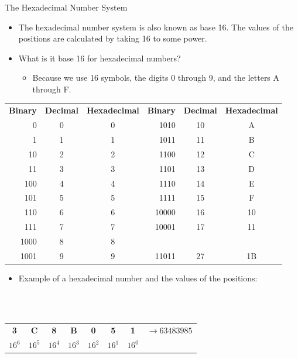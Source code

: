 \documentclass[graphics]{beamer}
\newcommand*{\thead}[1]{\multicolumn{1}{c}{\bfseries #1}}
\begin{document}
\begin{frame}{The Hexadecimal Number System}
     {
        \begin{itemize}
            \item The hexadecimal number system is also known as base 16. The values of the positions are calculated by taking 16 to some power.
            \item What is it base 16 for hexadecimal numbers?
            \begin{itemize}
                \item Because we use 16 symbols, the digits 0 through 9, and the letters A through F.
            \end{itemize}
        \end{itemize}
    }
     {
        \begin{tabular}{r c c | r c c}
             \thead{Binary} & \thead{Decimal} & \thead{Hexadecimal} & \thead{Binary} & \thead{Decimal} & \thead{Hexadecimal}  \\
             0    & 0 & 0 & 1010 & 10 & A \\
             1    & 1 & 1 & 1011 & 11 & B \\
             10   & 2 & 2 & 1100 & 12 & C \\
             11   & 3 & 3 & 1101 & 13 & D \\
             100  & 4 & 4 & 1110 & 14 & E \\
             101  & 5 & 5 & 1111 & 15 & F \\
             110  & 6 & 6 & 10000 & 16 & 10 \\
             111  & 7 & 7 & 10001 & 17 & 11 \\
             1000 & 8 & 8 &       &    & \\
             1001 & 9 & 9 & 11011 & 27 & 1B
        \end{tabular}
    }
     {
        \begin{itemize}
            \item Example of a hexadecimal number and the values of the positions:
        \end{itemize}
        \\ ~~ \\
        \begin{tabular}{c c c c c c c c}
             \thead{3} & \thead{C} & \thead{8} & \thead{B} & \thead{0} & \thead{5} & \thead{1} & $\rightarrow63483985$ \\
             $16^6$ & $16^5$ & $16^4$ & $16^3$ & $16^2$ & $16^1$ & $16^0$ & 

\end{tabular}}
\end{frame}
\end{document}
